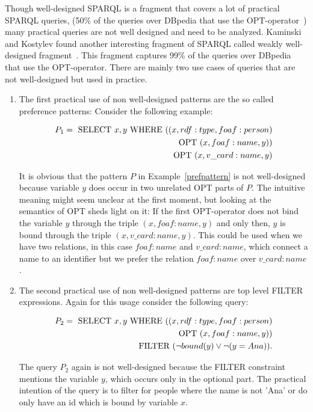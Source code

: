 Though well-designed SPARQL is a fragment that covers a lot of practical SPARQL
queries, (50\% of the queries over DBpedia that use the
OPT-operator~\cite{Picalausa})
many practical queries are not well designed and need to be analyzed. 
Kaminski and Kostylev found another
interesting fragment of SPARQL called weakly well-designed fragment~\cite{kaminski_bwd}. This
fragment captures 99\% of the queries over DBpedia that use the OPT-operator. 
There are mainly two use cases of queries that are not well-designed but used in
practice.
\begin{enumerate}
	\item The first practical use of non well-designed patterns are the so called
		preference patterns:
		Consider the following example:
		\begin{example}\label{prefpattern}
			\begin{align*}
				P_1 =	\mbox{ SELECT } x, y  \mbox{ WHERE } ((x,rdf:type,foaf:person)\\ \mbox{ OPT } (x,foaf:name,y))\\
				\mbox{ OPT } (x,v\_card:name,y)
			\end{align*}
		\end{example}
		It is obvious that the pattern $P$ in Example~\ref{prefpattern} 
		is not well-designed because variable
		$y$ does occur in two unrelated OPT parts of $P$. The
		intuitive meaning might seem unclear at the first moment, 
		but looking at the semantics of OPT sheds light on it: If the first OPT-operator
		does not bind the variable $y$ through the triple $(x, foaf:name, y)$ 
		and only then, $y$ is bound through the triple $(x, v\_card:name, y)$.
		This could be used when we have two relations, in this case $foaf:name$
		and $v\_card:name$, which connect a name to an identifier but we prefer
		the relation $foaf:name$ over $v\_card:name$.

	\item The second practical use of non well-designed patterns are top level
		FILTER expressions. Again for this usage consider the following query:
		\begin{example}\label{toplevelfilter}
			\begin{align*}
				P_2 = \mbox{ SELECT } x,y \mbox{ WHERE } ((x,rdf:type,foaf:person)\\ \mbox{ OPT } (x,
				foaf:name,y))\\ 
				\mbox{ FILTER }(\neg bound(y) \lor \neg(y = Ana)).
			\end{align*}
		\end{example}
		The query $P_2$ again is not well-designed because the FILTER constraint
		mentions the variable $y$, which occurs only in the optional
		part. The practical intention of the query is to filter for people
		where the name is not 'Ana' or do only have an id which is bound by
		variable $x$. 
\end{enumerate}

